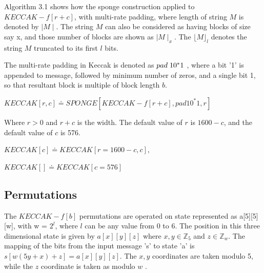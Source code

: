   Algorithm 3.1 shows how the sponge construction applied to $KECCAK-f[r + c]$, with multi-rate padding, where length of
  string $M$ is denoted by $\mid M \mid $. The string $M$ can also be considered as having blocks of size say x,
  and those number of blocks are shown as $\mid M \mid_{x}$. The $\lfloor M \rfloor_{l}$ denotes the string
  $M$ truncated to its first $l$ bits.
  
  The multi-rate padding in Keccak is denoted as $pad \thickspace 1 0^{*}1$ , where a bit '1' is appended to message, 
  followed by minimum number of zeros, and a single bit 1, so that resultant block is multiple of block length $b$.
  \begin{center}$KECCAK[r, c] \doteq SPONGE[KECCAK-f[r + c], pad1 0^{*}1, r]$ \end{center}
  Where $ r > 0$ and $r + c$ is the width. The default value of $r$ is $1600 - c$, and the default value of $c$ is 576.
  \begin{center}$KECCAK[c] \doteq KECCAK[r = 1600 - c, c],$\end{center}
  \begin{center}$KECCAK[] \doteq KECCAK[c = 576]$\end{center}
    
  \subsection{Permutations}

  The $KECCAK-f[b]$ permutations are operated on state represented as a[5][5][w], with w = $2^{l}$, where $l$ can be any value
  from 0 to 6. The position in this three dimensional state is given by $a[x][y][z]$ where $x, y \in \mathbb{Z}_{5}$ and $z \in 
  \mathbb{Z}_{w}$. The mapping of the bits from the input message 's' to state 'a' is $s[w (5y + x) + z] = a[x][y][z]$.
  The $x, y$ coordinates are taken modulo 5, while the $z$ coordinate is taken as modulo $w$ \cite{00015}.

